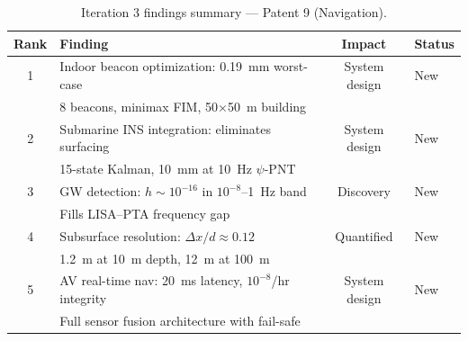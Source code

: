 \documentclass[aps,prd,twocolumn,superscriptaddress,nofootinbib]{revtex4-2}
\begin{document}
\begin{table}[t]
\caption{Iteration 3 findings summary --- Patent 9 (Navigation).}
\begin{ruledtabular}
\begin{tabular}{clcl}
Rank & Finding & Impact & Status \\
\hline
1 & Indoor beacon optimization: 0.19~mm worst-case & System design &
New \\
  & 8 beacons, minimax FIM, 50$\times$50~m building & & \\
2 & Submarine INS integration: eliminates surfacing & System design &
New \\
  & 15-state Kalman, 10~mm at 10~Hz $\psi$-PNT & & \\
3 & GW detection: $h \sim 10^{-16}$ in $10^{-8}$--1~Hz band & Discovery &
New \\
  & Fills LISA--PTA frequency gap & & \\
4 & Subsurface resolution: $\Delta x/d \approx 0.12$ & Quantified &
New \\
  & 1.2~m at 10~m depth, 12~m at 100~m & & \\
5 & AV real-time nav: 20~ms latency, $10^{-8}$/hr integrity & System design &
New \\
  & Full sensor fusion architecture with fail-safe & & \\
\end{tabular}
\end{ruledtabular}
\end{table}
\end{document}
